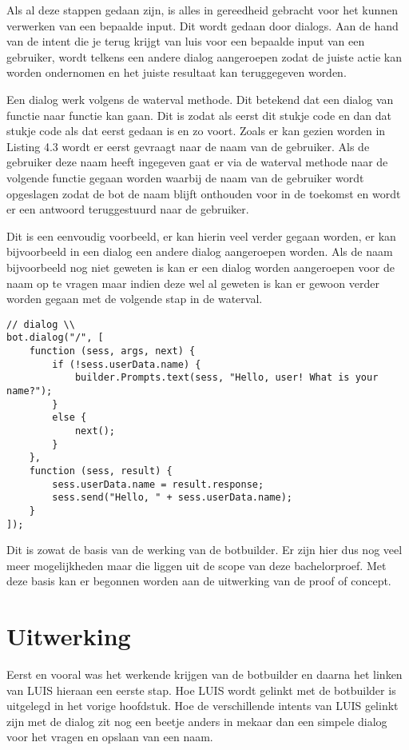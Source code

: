 Als al deze stappen gedaan zijn, is alles in gereedheid gebracht voor het kunnen verwerken van een bepaalde input. Dit wordt gedaan door dialogs. Aan de hand van de intent die je terug krijgt van luis voor een bepaalde input van een gebruiker, wordt telkens een andere dialog aangeroepen zodat de juiste actie kan worden ondernomen en het juiste resultaat kan teruggegeven worden.

Een dialog werk volgens de waterval methode. Dit betekend dat een dialog van functie naar functie kan gaan. Dit is zodat als eerst dit stukje code en dan dat stukje code als dat eerst gedaan is en zo voort. Zoals er kan gezien worden in Listing 4.3 wordt er eerst gevraagt naar de naam van de gebruiker. Als de gebruiker deze naam heeft ingegeven gaat er via de waterval methode naar de volgende functie gegaan worden waarbij de naam van de gebruiker wordt opgeslagen zodat de bot de naam blijft onthouden voor in de toekomst en wordt er een antwoord teruggestuurd naar de gebruiker.

Dit is een eenvoudig voorbeeld, er kan hierin veel verder gegaan worden, er kan bijvoorbeeld in een dialog een andere dialog aangeroepen worden. Als de naam bijvoorbeeld nog niet geweten is kan er een dialog worden aangeroepen voor de naam op te vragen maar indien deze wel al geweten is kan er gewoon verder worden gegaan met de volgende stap in de waterval.

\medskip
\begin{lstlisting}[caption=Waterval methode]
// dialog \\
bot.dialog("/", [
	function (sess, args, next) {
		if (!sess.userData.name) {
			builder.Prompts.text(sess, "Hello, user! What is your name?");
		}
		else {
			next();
		}
	},
	function (sess, result) {
		sess.userData.name = result.response;
		sess.send("Hello, " + sess.userData.name);
	}
]);
\end{lstlisting}

Dit is zowat de basis van de werking van de botbuilder. Er zijn hier dus nog veel meer mogelijkheden maar die liggen uit de scope van deze bachelorproef. Met deze basis kan er begonnen worden aan de uitwerking van de proof of concept.

\section{Uitwerking}
\label{sec:Uitwerking}

Eerst en vooral was het werkende krijgen van de botbuilder en daarna het linken van LUIS hieraan een eerste stap. Hoe LUIS wordt gelinkt met de botbuilder is uitgelegd in het vorige hoofdstuk. Hoe de verschillende intents van LUIS gelinkt zijn met de dialog zit nog een beetje anders in mekaar dan een simpele dialog voor het vragen en opslaan van een naam.

